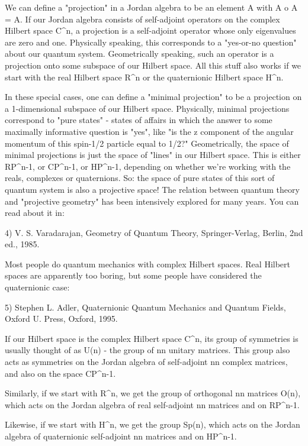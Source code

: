 We can define a "projection" in a Jordan algebra to be an element A
with A o A = A.  If our Jordan algebra consists of self-adjoint
operators on the complex Hilbert space C^{n}, a projection is a
self-adjoint operator whose only eigenvalues are zero and one.
Physically speaking, this corresponds to a "yes-or-no question" about
our quantum system.  Geometrically speaking, such an operator is a
projection onto some subspace of our Hilbert space.  All this stuff also
works if we start with the real Hilbert space R^{n} or the quaternionic
Hilbert space H^{n}.  


 In these special cases, one can define a "minimal
projection" to be a projection on a 1-dimensional subspace of our
Hilbert space.  Physically, minimal projections correspond to "pure
states" - states of affairs in which the answer to some 
maximally informative question is "yes", like "is
the z component of the angular momentum of this spin-1/2 particle
equal to 1/2?"  Geometrically, the space of minimal projections
is just the space of "lines" in our Hilbert space.  This is
either RP^{n-1}, or CP^{n-1}, or HP^{n-1},
depending on whether we're working with the reals, complexes or
quaternions.  So: the space of pure states of this sort of quantum
system is also a projective space!  The relation between quantum theory
and "projective geometry" has been intensively explored for
many years.  You can read about it in:

4) V. S. Varadarajan, Geometry of Quantum Theory, Springer-Verlag,
Berlin, 2nd ed., 1985.

Most people do quantum mechanics with complex Hilbert spaces.  Real
Hilbert spaces are apparently too boring, but some people have 
considered the quaternionic case:

5) Stephen L. Adler, Quaternionic Quantum Mechanics and Quantum Fields, 
Oxford U. Press, Oxford, 1995.

If our Hilbert space is the complex Hilbert space C^{n}, its group of
symmetries is usually thought of as U(n) - the group of n\times n unitary
matrices.  This group also acts as symmetries on the Jordan algebra of
self-adjoint n\times n complex matrices, and also on the space CP^{n-1}.

Similarly, if we start with R^{n}, we get the group of orthogonal n\times n
matrices O(n), which acts on the Jordan algebra of real self-adjoint
n\times n matrices and on RP^{n-1}.  

Likewise, if we start with H^{n}, we get
the group Sp(n), which acts on the Jordan algebra of quaternionic
self-adjoint n\times n matrices and on HP^{n-1}.  

